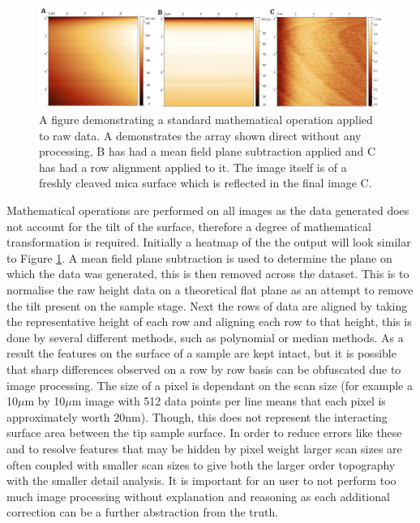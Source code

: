 \begin{figure}[h!]     %
        \begin{center}
          \includegraphics[width=140mm]{chapter2/MathOp.png}
\end{center}
\caption{A figure demonstrating a standard mathematical operation applied to raw data. A demonstrates the array shown direct without any processing, B has had a mean field plane subtraction applied and C has had a row alignment applied to it. The image itself is of a freshly cleaved mica surface which is reflected in the final image C.}
\label{fig:MathOp}                 %
\end{figure}

Mathematical operations are performed on all images as the data generated does not account for the tilt of the surface, therefore a degree of mathematical transformation is required. Initially a heatmap of the the output will look similar to Figure \ref{fig:MathOp}. A mean field plane subtraction is used to determine the plane on which the data was generated, this is then removed across the dataset. This is to normalise the raw height data on a theoretical flat plane as an attempt to remove the tilt present on the sample stage. Next the rows of data are aligned by taking the representative height of each row and aligning each row to that height, this is done by several different methods, such as polynomial or median methods. As a result the features on the surface of a sample are kept intact, but it is possible that sharp differences observed on a row by row basis can be obfuscated due to image processing. The size of a pixel is dependant on the scan size (for example a 10$\mu$m by 10$\mu$m image with 512 data points per line means that each pixel is approximately worth 20nm). Though, this does not represent the interacting surface area between the tip sample surface. In order to reduce errors like these and to resolve features that may be hidden by pixel weight larger scan sizes are often coupled with smaller scan sizes to give both the larger order topography with the smaller detail analysis. It is important for an user to not perform too much image processing without explanation and reasoning as each additional correction can be a further abstraction from the truth.

